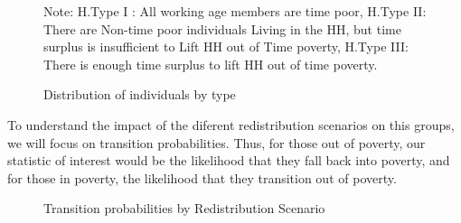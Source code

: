 \documentclass[
  11pt,
]{article}
\begin{document}
\begin{figure}[H]
{\begin{figure}[H]
\begin{minipage}{0.50\linewidth}
{}


\end{minipage}%

\end{figure}%

\footnotesize 

\begin{flushleft}Note: H.Type I : All working age members are time poor, H.Type II: There are Non-time poor individuals Living in the HH, but time surplus is insufficient to Lift HH out of Time poverty, H.Type III: There is enough time surplus to lift HH out of time poverty.\end{flushleft}

}

\caption{\label{fig-dist}Distribution of individuals by type}

\end{figure}%

To understand the impact of the diferent redistribution scenarios on
this groups, we will focus on transition probabilities. Thus, for those
out of poverty, our statistic of interest would be the likelihood that
they fall back into poverty, and for those in poverty, the likelihood
that they transition out of poverty.

\begin{figure}[H]


\caption{\label{fig-transition1}Transition probabilities by
Redistribution Scenario}

\end{figure}%
\end{document}
